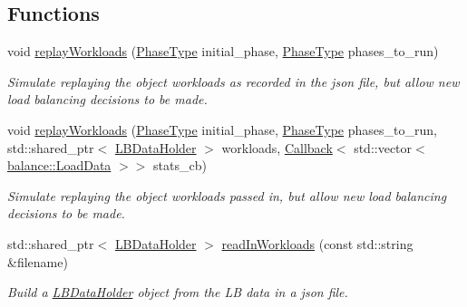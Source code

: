 \subsection*{Functions}
\begin{DoxyCompactItemize}
\item 
void \hyperlink{namespacevt_1_1vrt_1_1collection_1_1balance_1_1replay_ae08097ad160d549bdb41f410d932ca85}{replay\+Workloads} (\hyperlink{namespacevt_a46ce6733d5cdbd735d561b7b4029f6d7}{Phase\+Type} initial\+\_\+phase, \hyperlink{namespacevt_a46ce6733d5cdbd735d561b7b4029f6d7}{Phase\+Type} phases\+\_\+to\+\_\+run)
\begin{DoxyCompactList}\small\item\em Simulate replaying the object workloads as recorded in the json file, but allow new load balancing decisions to be made. \end{DoxyCompactList}\item 
void \hyperlink{namespacevt_1_1vrt_1_1collection_1_1balance_1_1replay_ab2f2987683be208f2ab34cc3c532ba7a}{replay\+Workloads} (\hyperlink{namespacevt_a46ce6733d5cdbd735d561b7b4029f6d7}{Phase\+Type} initial\+\_\+phase, \hyperlink{namespacevt_a46ce6733d5cdbd735d561b7b4029f6d7}{Phase\+Type} phases\+\_\+to\+\_\+run, std\+::shared\+\_\+ptr$<$ \hyperlink{structvt_1_1vrt_1_1collection_1_1balance_1_1_l_b_data_holder}{L\+B\+Data\+Holder} $>$ workloads, \hyperlink{namespacevt_a57b238783d05de96bc2c4027f7073b7f}{Callback}$<$ std\+::vector$<$ \hyperlink{structvt_1_1vrt_1_1collection_1_1balance_1_1_load_data}{balance\+::\+Load\+Data} $>$$>$ stats\+\_\+cb)
\begin{DoxyCompactList}\small\item\em Simulate replaying the object workloads passed in, but allow new load balancing decisions to be made. \end{DoxyCompactList}\item 
std\+::shared\+\_\+ptr$<$ \hyperlink{structvt_1_1vrt_1_1collection_1_1balance_1_1_l_b_data_holder}{L\+B\+Data\+Holder} $>$ \hyperlink{namespacevt_1_1vrt_1_1collection_1_1balance_1_1replay_a2177c340e50c514aa567bde597a58139}{read\+In\+Workloads} (const std\+::string \&filename)
\begin{DoxyCompactList}\small\item\em Build a \hyperlink{structvt_1_1vrt_1_1collection_1_1balance_1_1_l_b_data_holder}{L\+B\+Data\+Holder} object from the LB data in a json file. \end{DoxyCompactList}\end{DoxyCompactItemize}


